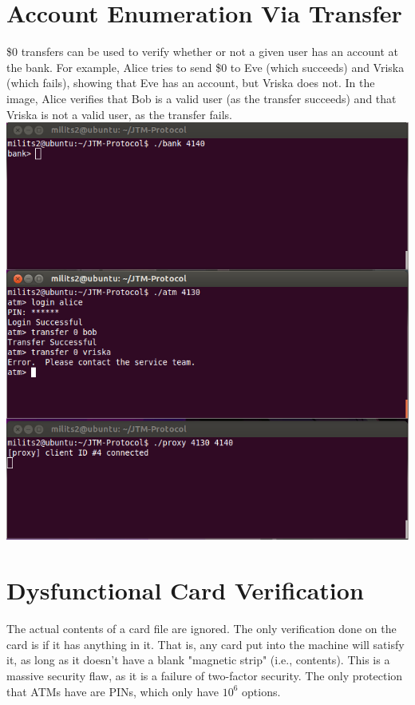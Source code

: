 \documentclass{article}
\begin{document}
\section{Account Enumeration Via Transfer}
\$0 transfers can be used to verify whether or not a given user has an account at the bank. For example, Alice tries to send \$0 to Eve (which succeeds) and Vriska (which fails), showing that Eve has an account, but Vriska does not. In the image, Alice verifies that Bob is a valid user (as the transfer succeeds) and that Vriska is not a valid user, as the transfer fails.
\\
\includegraphics[scale=0.5]{transferUser.png}
\\

\section{Dysfunctional Card Verification}
The actual contents of a card file are ignored. The only verification done on the card is if it has anything in it. That is, any card put into the machine will satisfy it, as long as it doesn't have a blank "magnetic strip" (i.e., contents). This is a massive security flaw, as it is a failure of two-factor security. The only protection that ATMs have are PINs, which only have $10^6$ options.
\end{document}
